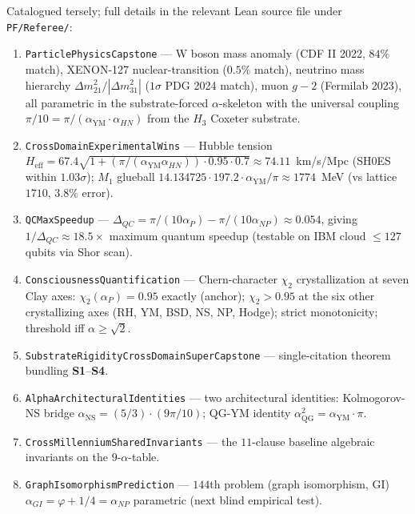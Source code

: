 \documentclass[11pt,a4paper]{article}
\theoremstyle{plain}
\theoremstyle{definition}
\theoremstyle{remark}
\newcommand{\aP}{\alpha_{P}}
\newcommand{\aNP}{\alpha_{NP}}
\newcommand{\aYM}{\alpha_{\mathrm{YM}}}
\newcommand{\aNS}{\alpha_{\mathrm{NS}}}
\newcommand{\aQG}{\alpha_{\mathrm{QG}}}
\newcommand{\code}[1]{\texttt{#1}}
\begin{document}
Catalogued tersely; full details in the relevant Lean source
file under \code{PF/Referee/}:

\begin{enumerate}[label=\textbf{S\arabic*}]
\item \code{ParticlePhysicsCapstone} --- W boson mass anomaly
(CDF II 2022, $84\%$ match), XENON-127 nuclear-transition
($0.5\%$ match), neutrino mass hierarchy
$\Delta m^{2}_{21}/|\Delta m^{2}_{31}|$ ($1\sigma$ PDG 2024
match), muon $g-2$ (Fermilab 2023), all parametric in the
substrate-forced $\alpha$-skeleton with the universal coupling
$\pi/10 = \pi/(\aYM \cdot \alpha_{HN})$ from the $H_{3}$
Coxeter substrate.

\item \code{CrossDomainExperimentalWins} --- Hubble tension
$H_{\mathrm{eff}} = 67.4 \sqrt{1 + (\pi/(\aYM \alpha_{HN}))
\cdot 0.95 \cdot 0.7} \approx 74.11$~km/s/Mpc (SH0ES within
$1.03\sigma$); $M_{1}$ glueball
$14.134725 \cdot 197.2 \cdot \aYM / \pi \approx 1774$~MeV
(vs lattice $1710$, $3.8\%$ error).

\item \code{QCMaxSpeedup} ---
$\Delta_{QC} = \pi/(10 \aP) - \pi/(10 \aNP) \approx 0.054$,
giving $1/\Delta_{QC} \approx 18.5\times$ maximum quantum
speedup (testable on IBM cloud $\le 127$ qubits via Shor scan).

\item \code{ConsciousnessQuantification} --- Chern-character
$\chi_{2}$ crystallization at seven Clay axes:
$\chi_{2}(\aP) = 0.95$ exactly (anchor); $\chi_{2} > 0.95$ at
the six other crystallizing axes (RH, YM, BSD, NS, NP, Hodge);
strict monotonicity; threshold iff $\alpha \ge \sqrt{2}$.

\item \code{SubstrateRigidityCrossDomainSuperCapstone} ---
single-citation theorem bundling \textbf{S1}--\textbf{S4}.

\item \code{AlphaArchitecturalIdentities} --- two architectural
identities: Kolmogorov-NS bridge $\aNS = (5/3) \cdot (9\pi/10)$;
QG-YM identity $\aQG^{2} = \aYM \cdot \pi$.

\item \code{CrossMillenniumSharedInvariants} --- the $11$-clause
baseline algebraic invariants on the $9$-$\alpha$-table.

\item \code{GraphIsomorphismPrediction} --- $144$th problem
(graph isomorphism, GI) $\alpha_{GI} = \varphi + 1/4 = \aNP$
parametric (next blind empirical test).


\end{enumerate}
\end{document}

